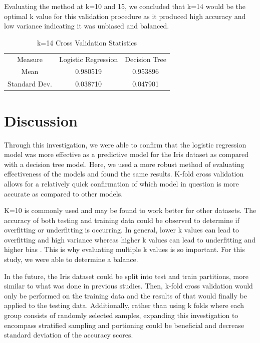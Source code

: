\documentclass[journal]{IEEEtran}
\begin{document}
\vspace{60px}
Evaluating the method at k=10 and 15, we concluded that k=14 would be the optimal k value for this validation procedure as it produced high accuracy and low variance indicating it was unbiased and balanced. 

\begin{table}[h!]
    \centering
    \begin{tabular}{ c | c c }
    Measure & Logistic Regression & Decision Tree \\
    Mean&	0.980519&	0.953896 \\
    Standard Dev.	&0.038710&	0.047901
    \end{tabular}
    \caption{k=14 Cross Validation Statistics}
    \label{table:MultiFoldCV-k14}
    \end{table}

\section{Discussion}
\label{sec:discussion}
Through this investigation, we were able to confirm that the logistic regression model was more effective as a predictive model for the Iris dataset as compared with a decision tree model. Here, we used a more robust method of evaluating effectiveness of the models and found the same results. K-fold cross validation allows for a relatively quick confirmation of which model in question is more accurate as compared to other models. 

K=10 is commonly used and may be found to work better for other datasets. The accuracy of both testing and training data could be observed to determine if overfitting or underfitting is occurring. In general, lower k values can lead to overfitting and high variance whereas higher k values can lead to underfitting and higher bias \cite{b5}. This is why evaluating multiple k values is so important. For this study, we were able to determine a balance.

In the future, the Iris dataset could be split into test and train partitions, more similar to what was done in previous studies. Then, k-fold cross validation would only be performed on the training data and the results of that would finally be applied to the testing data. Additionally, rather than using k folds where each group consists of randomly selected samples, expanding this investigation to encompass stratified sampling and portioning could be beneficial and decrease standard deviation of the accuracy scores.
\end{document}
